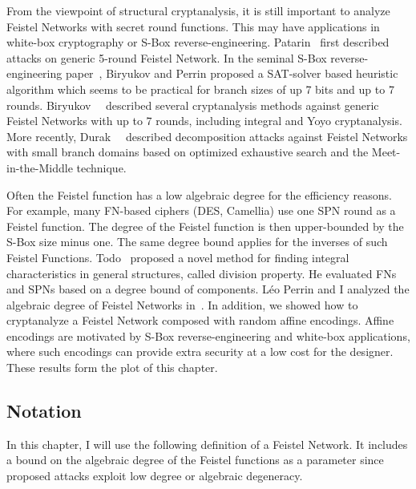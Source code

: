 From the viewpoint of structural cryptanalysis, it is still important to analyze Feistel Networks with secret round functions. This may have applications in white-box cryptography or S-Box reverse-engineering. Patarin~\cite{Feistel5Patarin,Feistel5Patarin2} first described attacks on generic 5-round Feistel Network. In the seminal S-Box reverse-engineering paper~\cite{LeoRE}, Biryukov and Perrin proposed a SAT-solver based heuristic algorithm which seems to be practical for branch sizes of up 7 bits and up to 7 rounds. Biryukov~\etal{}~\cite{LeoFeistel} described several cryptanalysis methods against generic Feistel Networks with up to 7 rounds, including integral and Yoyo cryptanalysis. More recently, Durak~\etal{}~\cite{FeistelDurak} described decomposition attacks against Feistel Networks with small branch domains based on optimized exhaustive search and the Meet-in-the-Middle technique.

Often the Feistel function has a low algebraic degree for the efficiency reasons. For example, many FN-based ciphers (DES, Camellia) use one SPN round as a Feistel function. The degree of the Feistel function is then upper-bounded by the S-Box size minus one. The same degree bound applies for the inverses of such Feistel Functions. Todo~\cite{division} proposed a novel method for finding integral characteristics in general structures, called division property. He evaluated FNs and SPNs based on a degree bound of components. Léo Perrin and I analyzed the algebraic degree of Feistel Networks in~\cite{OurFeistel}. In addition, we showed how to cryptanalyze a Feistel Network composed with random affine encodings. Affine encodings are motivated by S-Box reverse-engineering and white-box applications, where such encodings can provide extra security at a low cost for the designer. These results form the plot of this chapter.

\subsection{Notation}
In this chapter, I will use the following definition of a Feistel Network. It includes a bound on the algebraic degree of the Feistel functions as a parameter since proposed attacks exploit low degree or algebraic degeneracy.

